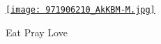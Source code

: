 \captionsetup[figure]{labelformat=empty}
\begin{figure}
\centering
\href{http://www.boston.com/ae/movies/articles/2010/08/13/eat\_pray\_love\_movie\_review\_\_\_\_eat\_pray\_love\_showtimes/}{\texttt{[image: 971906210\_AkKBM-M.jpg]}}
\caption{Eat Pray  Love}
\label{fig:754X0}
\end{figure}




%